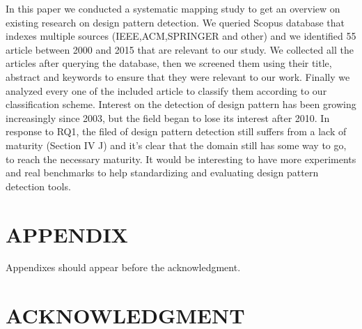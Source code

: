 \documentclass[letterpaper, 10 pt, conference]{ieeeconf}  %
\begin{document}
In this paper we conducted a systematic mapping study to get an overview on existing research on design pattern detection. We queried Scopus database that indexes multiple sources (IEEE,ACM,SPRINGER and other) and we identified 55 article between 2000 and 2015 that are relevant to our study. We collected all the articles after querying the database, then we screened them using their title, abstract and keywords to ensure that they were relevant to our work. Finally we analyzed every one of the included article to classify them according to our classification scheme.
Interest on the detection of design pattern has been growing increasingly since 2003, but the field began to lose its interest after 2010.
In response to RQ1, the filed of design pattern detection still suffers from a lack of maturity 
(Section IV J) and it's clear that the domain  still has some way to go, to reach the necessary maturity. It would be interesting to have more experiments and real benchmarks to help  standardizing and evaluating design pattern detection tools. 



\addtolength{\textheight}{-12cm}   








\section*{APPENDIX}

Appendixes should appear before the acknowledgment.

\section*{ACKNOWLEDGMENT}
\end{document}
